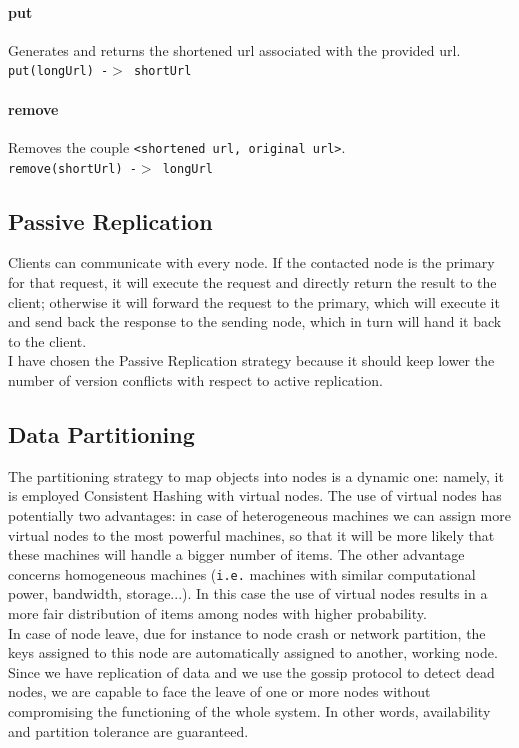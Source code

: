 \documentclass{article}
\begin{document}
\paragraph{put}
Generates and returns the shortened url associated with the provided url. \\
\texttt{put(longUrl) -$>$  shortUrl}

\paragraph{remove}
Removes the couple \texttt{<shortened url, original url>}.\\
\texttt{remove(shortUrl) -$>$  longUrl}


\subsection{Passive Replication}
Clients can communicate with every node. If the contacted node is the primary for that request, it will execute the request and directly return the result to the client; otherwise it will forward the request to the primary, which will execute it and send back the response to the sending node, which in turn will hand it back to the client. \\ 
I have chosen the Passive Replication strategy because it should keep lower the number of version conflicts with respect to active replication.

\subsection{Data Partitioning}
The partitioning strategy to map objects into nodes is a dynamic one: namely, it is employed Consistent Hashing with virtual nodes. The use of virtual nodes has potentially two advantages: in case of heterogeneous machines we can assign more virtual nodes to the most powerful machines, so that it will be more likely that these machines will handle a bigger number of items. The other advantage concerns homogeneous machines (\texttt{i.e.} machines with similar computational power, bandwidth, storage...). In this case the use of virtual nodes results in a more fair distribution of items among nodes with higher probability. \\ In case of node leave, due for instance to node crash or network partition, the keys assigned to this node are automatically assigned to another, working node. Since we have replication of data and we use the gossip protocol to detect dead nodes, we are capable to face the leave of one or more nodes without compromising the functioning of the whole system. In other words, availability and partition tolerance are guaranteed.
\end{document}
